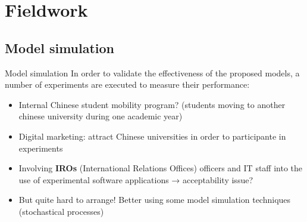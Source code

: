 

\section{Fieldwork} %

\subsection{Model simulation}

\begin{frame}{Model simulation}
	In order to validate the effectiveness of the proposed models, a number of experiments are executed to measure their performance:
  \begin{itemize}
	\item \alert{Internal Chinese student mobility program?} (students moving
to another chinese university during one academic year)
    \item Digital marketing: attract Chinese universities in order to
participante in experiments
    \item Involving \textbf{IROs} (International Relations Offices) officers and
IT staff into the use of experimental software applications →
acceptability issue?
	\item But quite hard to arrange! Better using some \alert{model simulation} techniques (stochastical
processes)

  \end{itemize}
\end{frame}
